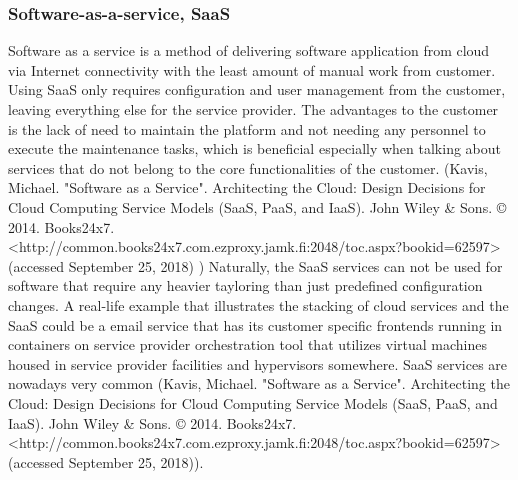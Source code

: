 \documentclass{article}
\begin{document}
\subsubsection{Software-as-a-service, SaaS}
Software as a service is a method of delivering software application from cloud via Internet connectivity with the least amount of manual work from customer. Using SaaS only requires configuration and user management from the customer, leaving everything else for the service provider. The advantages to the customer is the lack of need to maintain the platform and not needing any personnel to execute the maintenance tasks, which is beneficial especially when talking about services that do not belong to the core functionalities of the customer. (Kavis, Michael. "Software as a Service". Architecting the Cloud: Design Decisions for Cloud Computing Service Models (SaaS, PaaS, and IaaS). John Wiley \& Sons. © 2014. Books24x7. <http://common.books24x7.com.ezproxy.jamk.fi:2048/toc.aspx?bookid=62597> (accessed September 25, 2018) ) Naturally, the SaaS services can not be used for software that require any heavier tayloring than just predefined configuration changes.
A real-life example that illustrates the stacking of cloud services and the SaaS could be a email service that has its customer specific frontends running in containers on service provider orchestration tool that utilizes virtual machines housed in service provider facilities and hypervisors somewhere. SaaS services are nowadays very common (Kavis, Michael. "Software as a Service". Architecting the Cloud: Design Decisions for Cloud Computing Service Models (SaaS, PaaS, and IaaS). John Wiley \& Sons. © 2014. Books24x7. <http://common.books24x7.com.ezproxy.jamk.fi:2048/toc.aspx?bookid=62597> (accessed September 25, 2018)).
\end{document}
